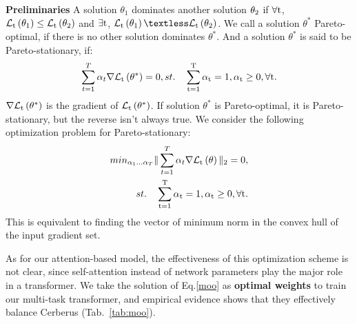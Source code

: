 \documentclass[10pt,twocolumn,letterpaper]{article}
\begin{document}
\textbf{Preliminaries} A solution $\theta_1$ dominates another solution $\rm \theta_2$ if $\rm \forall t$, $\mathcal{L}_{\rm t} \left(\theta_1\right) \leq \mathcal{L}_{\rm t} \left(\theta_2\right)$  and ${\rm \exists t}$, $ \mathcal{L}_{\rm t} \left(\theta_1\right) \textless \mathcal{L}_{\rm t} \left(\theta_2\right)$. We call a solution $\theta^{*}$ Pareto-optimal, if there is no other solution dominates  $\theta^{*}$. And a solution $\theta^{*}$ is said to be Pareto-stationary, if:
\begin{align}
\sum_{t=1}^{T} \alpha_t \nabla \mathcal{L}_{\rm t} \left(\theta^{*}\right) = 0,   
st.\rm \quad \sum_{t=1}^{T} \alpha_t = 1,\alpha_t \geq 0,\forall t. 
\end{align}
$ \nabla \mathcal{L}_{\rm t} \left(\theta^{*}\right)$ is the gradient of $\mathcal{L}_{\rm t} \left(\theta^{*}\right)$. If solution $\theta^{*}$ is Pareto-optimal, it is Pareto-stationary, but the reverse isn't always true\cite{desideri2012multiple}.  We consider the following optimization problem for Pareto-stationary:
\begin{align}
min_{\alpha_1...\alpha_T} \|\sum_{t=1}^{T} \alpha_t \nabla \mathcal{L}_{\rm t} \left(\theta \right)\| _2 = 0, \label{moo} \\
st. \rm \quad \sum_{t=1}^{T} \alpha_t = 1,\alpha_t \geq 0,\forall t. 
\end{align}
This is equivalent to finding the vector of minimum norm in the convex hull of the input gradient set. 

As for our attention-based model, the effectiveness of this optimization scheme is not clear, since self-attention instead of network parameters play the major role in a transformer. We take the solution of Eq.\ref{moo} as \textbf{optimal weights} to train our multi-task transformer, and empirical evidence shows that they effectively balance Cerberus (Tab.~\ref{tab:moo}). 
\end{document}
